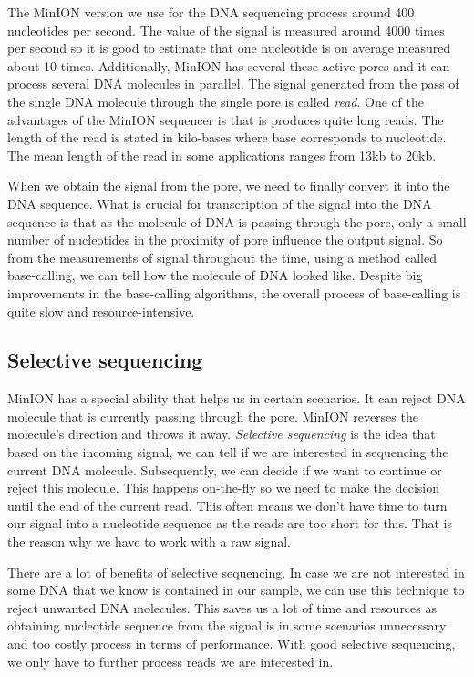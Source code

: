 The MinION version we use for the DNA sequencing process around 400 nucleotides per second.
The value of the signal is measured around 4000 times per second so it is good to
estimate that one nucleotide is on average measured about 10 times. Additionally,
MinION has several these active pores and it can process several DNA molecules in
parallel. The signal generated from the pass of the single DNA molecule through
the single pore is called \textit{read}. One of the advantages of the MinION sequencer is
that is produces quite long reads. The length of the read is stated in kilo-bases
where base corresponds to nucleotide. The mean length of the read in some
applications ranges from 13kb to 20kb.


When we obtain the signal from the pore, we need to finally convert it into the DNA
sequence. What is crucial for transcription of the signal into the DNA sequence is
that as the molecule of DNA is passing through the pore, only a small
number of nucleotides in the proximity of pore influence the output signal. So from
the measurements of signal throughout the time, using a method called base-calling,
we can tell how the molecule of DNA looked like. Despite big improvements in the
base-calling algorithms, the overall process of base-calling is quite slow and
resource-intensive.

\subsection{Selective sequencing}

MinION has a special ability that helps us in certain scenarios. It can reject
DNA molecule that is currently passing through the pore. MinION reverses the molecule’s direction and throws it away.
\textit{Selective sequencing} is the idea that based on the incoming signal, we can tell
if we are interested in sequencing the current DNA molecule. Subsequently, we can decide if we want
to continue or reject this molecule. This happens on-the-fly so we need to make
the decision until the end of the current read. This often means we don't have time to
turn our signal into a nucleotide sequence as the reads are too short for this.
That is the reason why we have to work with a raw signal.

There are a lot of benefits of selective sequencing. In case we are not interested
in some DNA that we know is contained in our sample, we can use this technique to
reject unwanted DNA molecules. This saves us a lot of time and resources as obtaining
nucleotide sequence from the signal is in some scenarios unnecessary and too
costly process in terms of performance. With good selective sequencing, we only have
to further process reads we are interested in.

